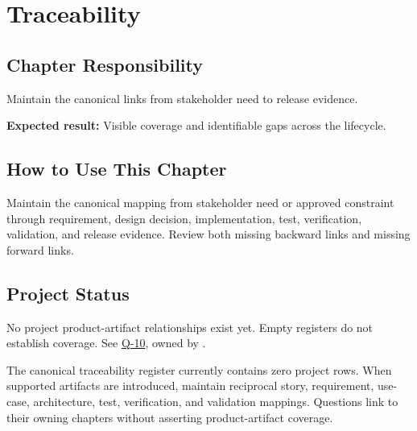 \chapter{Traceability}
\section{Chapter Responsibility}
\label{Section:TraceabilityResponsibility}
Maintain the canonical links from stakeholder need to release evidence.

\noindent\textbf{Expected result:} Visible coverage and identifiable gaps across the lifecycle.

\section{How to Use This Chapter}
Maintain the canonical mapping from stakeholder need or approved constraint through requirement, design decision, implementation, test, verification, validation, and release evidence. Review both missing backward links and missing forward links.

\section{Project Status}
No project product-artifact relationships exist yet. Empty registers do not establish coverage.
See \hyperref[Question:Q-10]{Q-10}, owned by \DocumentOwner.

\label{Table:TraceabilityMatrix}
The canonical traceability register currently contains zero project rows.
When supported artifacts are introduced, maintain reciprocal story, requirement,
use-case, architecture, test, verification, and validation mappings. Questions
link to their owning chapters without asserting product-artifact coverage.
